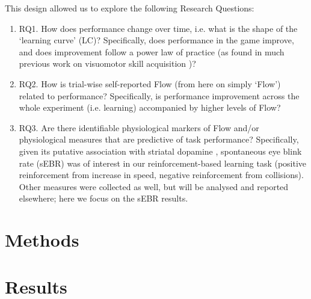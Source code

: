 \documentclass[a4paper,doc,floatsintext,natbib,10pt]{apa6}
\begin{document}
This design allowed us to explore the following Research Questions:
\begin{enumerate}
	\item RQ1. How does performance change over time, i.e. what is the shape of the `learning curve' (LC)? Specifically, does performance in the game improve, and does improvement follow a power law of practice (as found in much previous work on visuomotor skill acquisition \citep{Newell1982})?

	\item RQ2. How is trial-wise self-reported Flow (from here on simply `Flow') related to performance? Specifically, is performance improvement across the whole experiment (i.e. learning) accompanied by higher levels of Flow?

	\item RQ3. Are there identifiable physiological markers of Flow and/or physiological measures that are predictive of task performance? Specifically, given its putative association with striatal dopamine \citep{Slagter2012}, spontaneous eye blink rate (sEBR) was of interest in our reinforcement-based learning task (positive reinforcement from increase in speed, negative reinforcement from collisions). Other measures were collected as well, but will be analysed and reported elsewhere; here we focus on the sEBR results.

\end{enumerate}


\section*{Methods}



\section*{Results}



\end{document}
